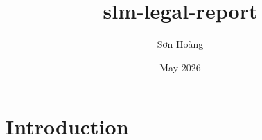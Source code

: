 \documentclass{article}
\title{slm-legal-report}
\author{Sơn Hoàng}
\date{May 2026}
\begin{document}
\maketitle

\section{Introduction}
\end{document}
